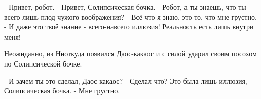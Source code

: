 - Привет, робот.
- Привет, Солипсическая бочка.
- Робот, а ты знаешь, что ты всего-лишь плод чужого воображения?
- Всё что я знаю, это то, что мне грустно.
- И даже это твоё знание - всего-навсего иллюзия! Реальность есть лишь внутри меня!

Неожиданно, из Ниоткуда появился Даос-какаос и с силой ударил своим посохом по Солипсической бочке.

- И зачем ты это сделал, Даос-какаос?
- Сделал что? Это была лишь иллюзия, Солипсическая бочка.
- Мне грустно.